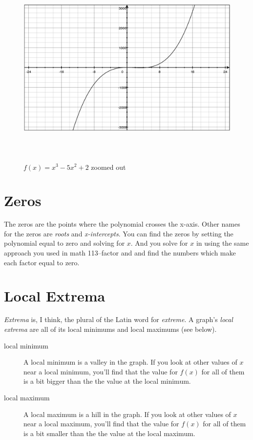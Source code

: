 \documentclass[fleqn,addpoints]{exam}
\begin{document}
\begin{figure}[H]
  \centering
  \includegraphics[width=14cm,height=10cm]{zoom_out.eps}
  \caption{$f(x) = x^3-5x^2+2$ zoomed out}
  \label{zoom:out}
\end{figure}


\section{Zeros}

The zeros are the points where the polynomial crosses the x-axis.  Other names for the zeros are {\em roots} and 
{\em x-intercepts}.  You can find the zeros by setting the polynomial equal to zero and solving for $x$.  And you solve for
$x$ in using the same approach you used in math 113--factor and and find the numbers which make each factor equal to
zero.

\section{Local Extrema}
{\em Extrema} is, I think, the plural of the Latin word for {\em extreme}.  A graph's {\em local extrema} are all of its
local minimums and local maximums (see below).

\begin{description}
\item[local minimum] A local minimum is a valley in the graph.  If you look at other values of $x$ near a local minimum, you'll find that the
value for $f(x)$ for all of them is a bit bigger than the the value at the local minimum.

\item[local maximum] A local maximum is a hill in the graph.  If you look at other values of $x$ near a local maximum, you'll find that the
value for $f(x)$ for all of them is a bit smaller than the the value at the local maximum.
\end{description}
\end{document}
